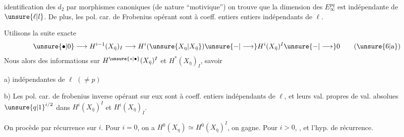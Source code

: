  identification des $d_2$ par morphismes canoniques (de nature ``motivique'') on trouve que la dimension des $E_\infty^{pq}$ est indépendante de $\unsure{\ell|l}$. De plus, les  pol. car. de Frobenius  opérant sont à coeff. entiers entiers indépendants de $\ell$.

Utilisons la suite exacte
\[
\unsure{\bullet|0}\longrightarrow H^{i-1}(X_{\bar\eta})_I\longrightarrow H^i(\unsure{X_\eta|X_{\bar\eta}})\unsure{-|\longrightarrow}H^i(X_{\bar\eta})^I\unsure{-|\longrightarrow}0
\tag*{(\unsure{6|a})}
\]
Nous   alors des informations sur $H^{\unsure{*|\bullet}}(X_{\bar\eta})^I$ et $H^*(X_{\bar\eta})_I$, savoir

a)  indépendantes de $\ell$ $(\neq p)$

b) Les pol. car. de frobenius inverse opérant sur eux sont à coeff. entiers indépendants de $\ell$, et leurs val. propres  de val. absolues ${\unsure{q|1}}^{i/2}$ dans $H^i(X_{\bar\eta})^I$ et $H^i(X_{\bar\eta})_I$.


On procède par récurrence sur $i$. Pour $i=0$, on a $H^0(X_\eta)\simeq H^0(X_{\bar\eta})^I$, on gagne. Pour $i>0$,    ,  et l'hyp. de récurrence.
